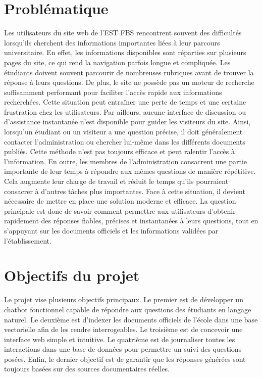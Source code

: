 \documentclass[12pt, a4paper, twoside]{report}
\begin{document}
\section{Problématique}
Les utilisateurs du site web de l’EST FBS rencontrent souvent des difficultés lorsqu’ils cherchent des informations importantes liées à leur parcours universitaire. En effet, les informations disponibles sont réparties sur plusieurs pages du site, ce qui rend la \newline navigation parfois longue et compliquée. Les étudiants doivent souvent parcourir de \newline nombreuses rubriques avant de trouver la réponse à leurs questions. De plus, le site ne possède pas un moteur de recherche suffisamment performant pour faciliter l’accès rapide aux informations recherchées. Cette situation peut entraîner une perte de temps et une certaine frustration chez les utilisateurs. Par ailleurs, aucune interface de discussion ou d’assistance instantanée n’est disponible pour guider les visiteurs du site. Ainsi, lorsqu’un étudiant ou un visiteur a une question précise, il doit généralement contacter \newline l’administration ou chercher lui-même dans les différents documents publiés. Cette \newline méthode n’est pas toujours efficace et peut ralentir l’accès à l’information. En outre, les membres de l’administration consacrent une partie importante de leur temps à répondre aux mêmes questions de manière répétitive. Cela augmente leur charge de travail et réduit le temps qu’ils pourraient consacrer à d’autres tâches plus importantes. Face à cette \newline situation, il devient nécessaire de mettre en place une solution moderne et efficace. La question principale est donc de savoir comment permettre aux utilisateurs d’obtenir \newline rapidement des réponses fiables, précises et instantanées à leurs questions, tout en \newline s’appuyant sur les documents officiels et les informations validées par l’établissement.

\section{Objectifs du projet}
Le projet vise plusieurs objectifs principaux. Le premier est de développer un \newline chatbot fonctionnel capable de répondre aux questions des étudiants en langage naturel. Le deuxième est d'indexer les documents officiels de l'école dans une base vectorielle afin de les rendre interrogeables. Le troisième est de concevoir une interface web simple et intuitive. Le quatrième est de journaliser toutes les interactions dans une base de données pour permettre un suivi des questions posées. Enfin, le dernier objectif est de garantir que les réponses générées sont toujours basées sur des sources documentaires réelles.
\newpage
\end{document}
